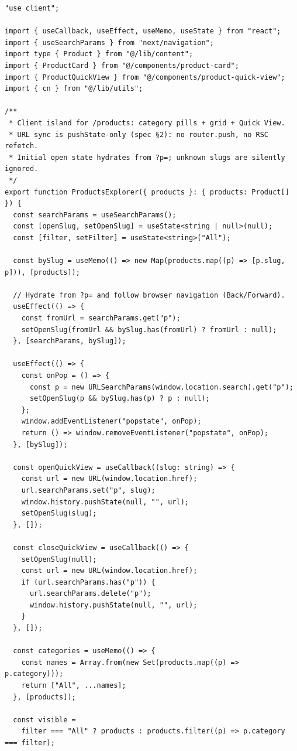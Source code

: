 \documentclass[11pt,a4paper]{article}
\begin{document}
\begin{lstlisting}
"use client";

import { useCallback, useEffect, useMemo, useState } from "react";
import { useSearchParams } from "next/navigation";
import type { Product } from "@/lib/content";
import { ProductCard } from "@/components/product-card";
import { ProductQuickView } from "@/components/product-quick-view";
import { cn } from "@/lib/utils";

/**
 * Client island for /products: category pills + grid + Quick View.
 * URL sync is pushState-only (spec §2): no router.push, no RSC refetch.
 * Initial open state hydrates from ?p=; unknown slugs are silently ignored.
 */
export function ProductsExplorer({ products }: { products: Product[] }) {
  const searchParams = useSearchParams();
  const [openSlug, setOpenSlug] = useState<string | null>(null);
  const [filter, setFilter] = useState<string>("All");

  const bySlug = useMemo(() => new Map(products.map((p) => [p.slug, p])), [products]);

  // Hydrate from ?p= and follow browser navigation (Back/Forward).
  useEffect(() => {
    const fromUrl = searchParams.get("p");
    setOpenSlug(fromUrl && bySlug.has(fromUrl) ? fromUrl : null);
  }, [searchParams, bySlug]);

  useEffect(() => {
    const onPop = () => {
      const p = new URLSearchParams(window.location.search).get("p");
      setOpenSlug(p && bySlug.has(p) ? p : null);
    };
    window.addEventListener("popstate", onPop);
    return () => window.removeEventListener("popstate", onPop);
  }, [bySlug]);

  const openQuickView = useCallback((slug: string) => {
    const url = new URL(window.location.href);
    url.searchParams.set("p", slug);
    window.history.pushState(null, "", url);
    setOpenSlug(slug);
  }, []);

  const closeQuickView = useCallback(() => {
    setOpenSlug(null);
    const url = new URL(window.location.href);
    if (url.searchParams.has("p")) {
      url.searchParams.delete("p");
      window.history.pushState(null, "", url);
    }
  }, []);

  const categories = useMemo(() => {
    const names = Array.from(new Set(products.map((p) => p.category)));
    return ["All", ...names];
  }, [products]);

  const visible =
    filter === "All" ? products : products.filter((p) => p.category === filter);


\end{lstlisting}
\end{document}

